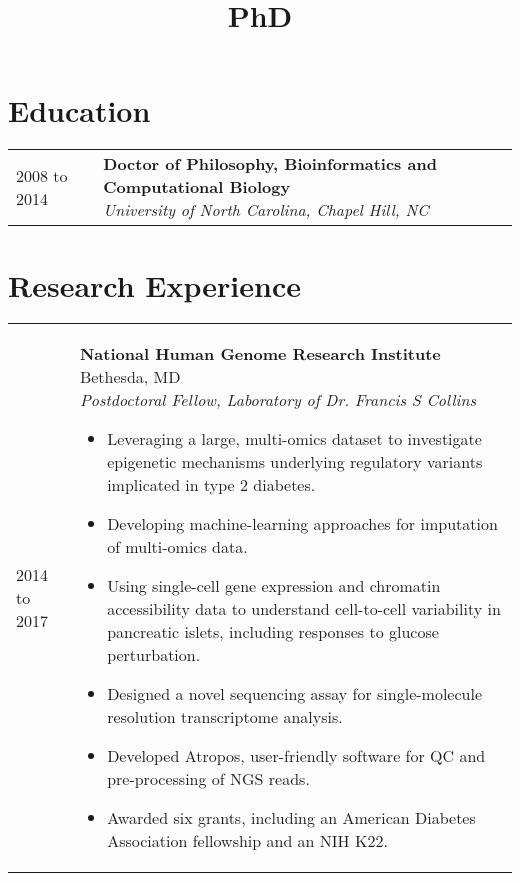 \documentclass[11pt,letter,sans]{moderncv}
\title{PhD}
\makeatletter
\newenvironment{entrylistThree}{%
  \begin{tabular*}{\textwidth}{@{\extracolsep{\fill}}ll}
}{%
  \end{tabular*}
}
\newcommand{\entryThree}[3]{%
  #1&\parbox[t]{140mm}{%
    \textbf{#2}\\%
    \textit{#3}\vspace{\parsep}%
  }\\}
\newenvironment{entrylistFive}{%
  \begin{tabular*}{\textwidth}{@{\extracolsep{\fill}}ll}
}{%
  \end{tabular*}
}
\newcommand{\entryFive}[5]{%
  #1&\parbox[t]{140mm}{%
    \textbf{#2}%
    \hfill%
    {\footnotesize #3}\\%
	\emph{#4}\\%
    #5\vspace{\parsep}%
  }\\}
\makeatother
\begin{document}
\makecvtitle

\section{Education}
\begin{entrylistThree}
\entryThree
{2008 to 2014}
{Doctor of Philosophy, Bioinformatics and Computational Biology}
{University of North Carolina, Chapel Hill, NC}
\entryThree
{1996 to 2001}
{Bachelor of Science, Computer Science}
{Northwestern University, Evanston, IL}
\end{entrylistThree}


\section{Research Experience}
\begin{entrylistFive}
\entryFive
{2014 to 2017}
{National Human Genome Research Institute}
{Bethesda, MD}
{Postdoctoral Fellow, Laboratory of Dr. Francis S Collins}
{\vspace{-5mm}
\begin{itemize}
\item {Leveraging a large, multi-omics dataset to investigate epigenetic mechanisms underlying regulatory variants implicated in type 2 diabetes.}
\item {Developing machine-learning approaches for imputation of multi-omics data.}
\item {Using single-cell gene expression and chromatin accessibility data to understand cell-to-cell variability in pancreatic islets, including responses to glucose perturbation.}
\item {Designed a novel sequencing assay for single-molecule resolution transcriptome analysis.}
\item {Developed Atropos, user-friendly software for QC and pre-processing of NGS reads.}
\item {Awarded six grants, including an American Diabetes Association fellowship and an NIH K22.}
\end{itemize}
}
\entryFive
{2009 to 2014}
{University of North Carolina at Chapel Hill}
{Chapel Hill, NC}
{Research Assistant, Laboratory of Dr. Fernando Pardo-Manuel de Villena}
{\vspace{-5mm}
\begin{itemize}
\item {Characterized a novel meiotic drive locus, \textit{R2d2}, and multiple modifier loci responsible for extreme transmission distortion in interspecific crosses.}
\item {Conducted a GWAS of wild mice to identify genes associated with the accumulation of Robertsonian translocations.}
\item {Developed CLASP, a software tool for validation of cell lines used in research.}
\end{itemize}
}
\entryFive
{2007 to 2008}
{Institute for Systems Biology}
{Seattle, WA}
{Computational Biology Software Engineer, Laboratory of Dr. Ruedi Aebersold}
{Created TIQAM, a work flow management system to support Multiple Reaction Monitoring (MRM) proteomics experiments.}
\end{entrylistFive}
\end{document}
